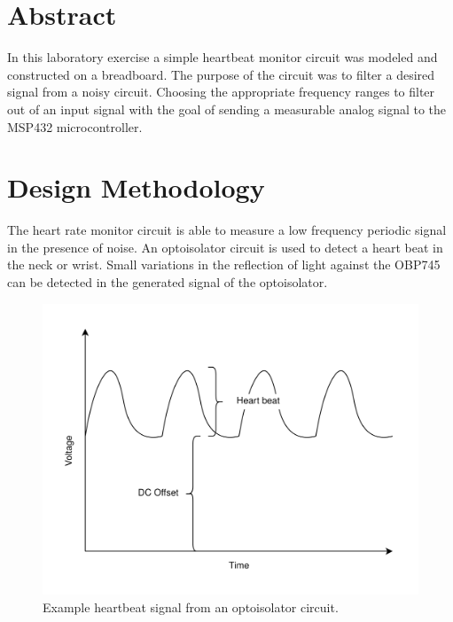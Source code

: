 \documentclass[CMPE]{../KGCOEReport}
\begin{document}
    \maketitle
    \section*{Abstract}

    In this laboratory exercise a simple heartbeat monitor circuit was modeled and
    constructed on a breadboard. The purpose of the circuit was to filter a desired
    signal from a noisy circuit. Choosing the appropriate frequency ranges to filter
    out of an input signal with the goal of sending a measurable analog signal to the
    MSP432 microcontroller.

    \section*{Design Methodology}

	The heart rate monitor circuit is able to measure a low frequency periodic signal
	in the presence of noise. An optoisolator circuit is used to detect a heart beat
	in the neck or wrist. Small variations in the reflection of light against the
	OBP745 can be detected in the generated signal of the optoisolator.

	\begin{figure}[h!]
        \centering
        \includegraphics[width=12cm]{heartbeat}
        \caption{Example heartbeat signal from an optoisolator circuit.}
        \label{fig:heartbeat}
	\end{figure}
\end{document}
